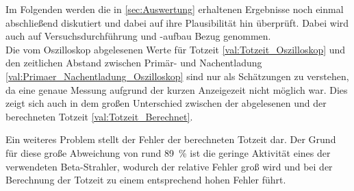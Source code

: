 Im Folgenden werden die in \cref{sec:Auswertung} erhaltenen Ergebnisse noch einmal 
abschließend diskutiert und dabei auf ihre Plausibilität hin überprüft.
Dabei wird auch auf Versuchsdurchführung und -aufbau Bezug genommen.\\


Die vom Oszilloskop abgelesenen Werte für Totzeit \cref{val:Totzeit_Oszilloskop} und den zeitlichen Abstand
zwischen Primär- und Nachentladung \cref{val:Primaer_Nachentladung_Oszilloskop} sind nur als
Schätzungen zu verstehen, da eine genaue Messung aufgrund der kurzen Anzeigezeit nicht möglich war.
Dies zeigt sich auch in dem großen Unterschied zwischen der abgelesenen und der berechneten 
Totzeit \cref{val:Totzeit_Berechnet}. 

Ein weiteres Problem stellt der Fehler der berechneten Totzeit dar.
Der Grund für diese große Abweichung von rund \SI{89}{\percent}
ist die geringe Aktivität eines der verwendeten Beta-Strahler, wodurch 
der relative Fehler groß wird und bei der Berechnung der Totzeit zu einem entsprechend
hohen Fehler führt.
  